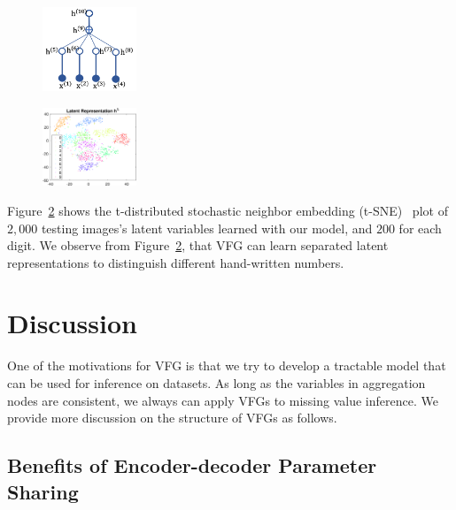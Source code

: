 \documentclass[twoside]{article}
\begin{document}
  \begin{figure}[H]
    \centering
       \includegraphics[width=0.25\textwidth]{fig/tree_mnist.png}
    \label{fig:struct}
\end{figure}
\begin{figure}[H]
    \centering
       \includegraphics[width=0.25\textwidth]{fig/z_Y.eps}
    \label{fig:z_tsne}
\end{figure}


Figure~\ref{fig:z_tsne} shows the t-distributed stochastic neighbor embedding (t-SNE)~\cite{maaten2008visualizing} plot of $2,000$ testing images's latent variables learned with our model, and $200$ for each digit. 
We observe from Figure~\ref{fig:z_tsne}, that VFG can learn separated latent representations to distinguish different hand-written numbers.

\section{ Discussion}

One of the motivations for VFG is that we try to develop a tractable model that can be used for inference on datasets. As long as the variables in aggregation nodes are consistent, we always can apply VFGs to missing value inference. We provide more discussion on the structure of VFGs as follows. 

\subsection{Benefits of Encoder-decoder Parameter Sharing}
\end{document}
